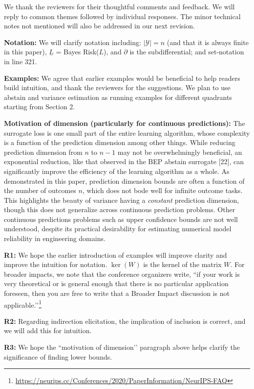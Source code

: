 \documentclass{article}
\newcommand{\Y}{\mathcal{Y}}
\begin{document}
We thank the reviewers for their thoughtful comments and feedback.  We will reply to common themes followed by individual responses.  The minor technical notes not mentioned will also be addressed in our next revision.  

\textbf{Notation:} We will clarify notation including: $|\Y| = n$ (and that it is always finite in this paper), $\underline{L}$ = Bayes Risk($L$), and $\partial$ is the subdifferential; and set-notation in line 321.

\textbf{Examples:} We agree that earlier examples would be beneficial to help readers build intuition, and thank the reviewers for the suggestions. We plan to use abstain and variance estimation as running examples for different quadrants starting from Section 2.  

\textbf{Motivation of dimension (particularly for continuous predictions):}  The surrogate loss is one small part of the entire learning algorithm, whose complexity is a function of the prediction dimension among other things.  While reducing prediction dimension from $n$ to $n-1$ may not be overwhelmingly beneficial, an exponential reduction, like that observed in the BEP abstain surrogate [22], can significantly improve the efficiency of the learning algorithm as a whole.  As demonstrated in this paper, prediction dimension bounds are often a function of the number of outcomes $n$, which does not bode well for infinite outcome tasks.  This highlights the beauty of variance having a \emph{constant} prediction dimension, though this does not generalize across continuous prediction problems.  Other continuous predictions problems such as upper confidence bounds are not well understood, despite its practical desirability for estimating numerical model reliability in engineering domains.


\textbf{R1:}  We hope the earlier introduction of examples will improve clarity and improve the intuition for notation. $\ker(W)$ is the kernel of the matrix $W$.
For broader impacts, we note that the conference organizers write, ``if your work is very theoretical or is general enough that there is no particular application foreseen, then you are free to write that a Broader Impact discussion is not applicable.’’\footnote{\url{https://neurips.cc/Conferences/2020/PaperInformation/NeurIPS-FAQ}}


\textbf{R2:}  Regarding indirection elicitation, the implication of inclusion is correct, and we will add this for intuition.


\textbf{R3:} We hope the ``motivation of dimension’’ paragraph above helps clarify the significance of finding lower bounds.
\end{document}
